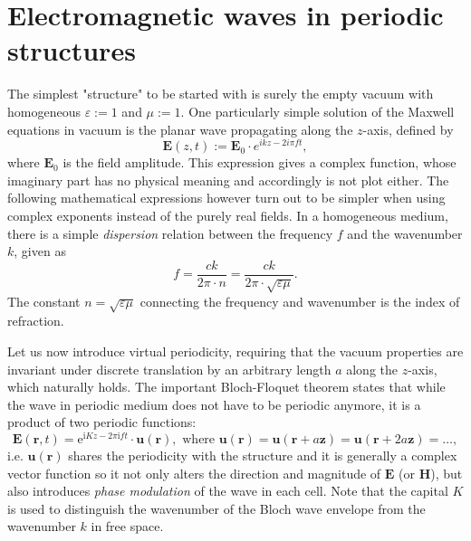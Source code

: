 \documentclass[letterpaper,12pt]{report}
\begin{document}
\section{Electromagnetic waves in periodic structures}
The simplest "structure" to be started with is surely the empty vacuum with homogeneous $\varepsilon := 1$ and $\mu := 1$. One particularly simple solution of the Maxwell equations in vacuum is the planar wave propagating along the $z$-axis, defined by%
\begin{equation} \mathbf{E}(z, t) := \mathbf{E}_0 \cdot e^{ikz- 2i\pi f t}, \label{eq_pw}\end{equation}
where $\mathbf{E}_0$ is the field amplitude.  This expression gives a complex function, whose imaginary part has no physical meaning and accordingly is not plot either. The following mathematical expressions however turn out to be simpler when using complex exponents instead of the purely real fields.
In a homogeneous medium, there is a simple \textit{dispersion} relation between the frequency  $f$ and the wavenumber $k$, given as
\begin{equation} f = \frac{ck}{2\pi \cdot n} = \frac{ck}{2\pi \cdot \sqrt{\varepsilon \mu}}. \label{eq_dispersion}\end{equation}
The constant $n = \sqrt{\varepsilon \mu}$ connecting the frequency and wavenumber is the index of refraction.

Let us now introduce virtual periodicity, requiring that the vacuum properties are invariant under discrete translation by an arbitrary length $a$ along the $z$-axis, which naturally holds. The important Bloch-Floquet theorem states that while the wave in periodic medium does not have to be periodic anymore, it is a product of two periodic functions:
\begin{equation} \mathbf{E}(\mathbf{r}, t) = \mathrm{e}^{\mathrm{i} Kz - 2\pi \mathrm{i} f t} \cdot \mathbf{u}(\mathbf{r}), \text{ where } \mathbf{u}(\mathbf{r}) = \mathbf{u}(\mathbf{r}+a\mathbf{z}) = \mathbf{u}(\mathbf{r}+2a\mathbf{z}) = \ldots, \label{eq_bloch}\end{equation} 
i.e. $\mathbf{u}(\mathbf{r})$ shares the periodicity with the structure and it is generally a complex vector function so it not only alters the direction and magnitude of $\mathbf E$ (or  $\mathbf H$), but also introduces \textit{phase modulation} of the wave in each cell. Note that the capital $K$ is used to distinguish the wavenumber of the Bloch wave envelope from the wavenumber $k$ in free space.
\end{document}
